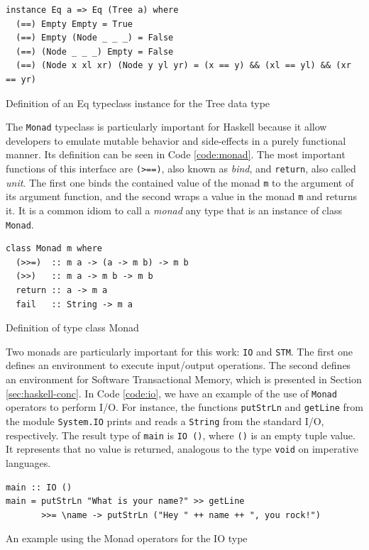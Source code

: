 \begin{listing}
  \begin{verbatim}
instance Eq a => Eq (Tree a) where
  (==) Empty Empty = True
  (==) Empty (Node _ _ _) = False
  (==) (Node _ _ _) Empty = False
  (==) (Node x xl xr) (Node y yl yr) = (x == y) && (xl == yl) && (xr == yr)
  \end{verbatim}
  \caption{Definition of an Eq typeclass instance for the Tree data type}
  \label{code:tree-eq}
\end{listing}

The \texttt{Monad} typeclass is particularly important for Haskell because it allow developers to emulate mutable behavior and side-effects in a purely functional manner. Its definition can be seen in Code \ref{code:monad}. The most important functions of this interface are \texttt{(>==)}, also known as \emph{bind}, and \texttt{return}, also called \emph{unit}. The first one binds the contained value of the monad \texttt{m} to the argument of its argument function, and the second wraps a value in the monad \texttt{m} and returns it. It is a common idiom to call a \emph{monad} any type that is an instance of class \texttt{Monad}.

\begin{listing}
  \begin{verbatim}
class Monad m where
  (>>=)  :: m a -> (a -> m b) -> m b
  (>>)   :: m a -> m b -> m b
  return :: a -> m a
  fail   :: String -> m a
  \end{verbatim}
  \caption{Definition of type class Monad}
  \label{code:monad}
\end{listing}

Two monads are particularly important for this work: \texttt{IO} and \texttt{STM}. The first one defines an environment to execute input/output operations. The second defines an environment for Software Transactional Memory, which is presented in Section \ref{sec:haskell-conc}. In Code \ref{code:io}, we have an example of the use of \texttt{Monad} operators to perform I/O. For instance, the functions \texttt{putStrLn} and \texttt{getLine} from the module \texttt{System.IO} prints and reads a \texttt{String} from the standard I/O, respectively. The result type of \texttt{main} is \texttt{IO ()}, where \texttt{()} is an empty tuple value. It represents that no value is returned, analogous to the type \texttt{void} on imperative languages.

\begin{listing}
  \begin{verbatim}
main :: IO ()
main = putStrLn "What is your name?" >> getLine
       >>= \name -> putStrLn ("Hey " ++ name ++ ", you rock!")
  \end{verbatim}
  \caption{An example using the Monad operators for the IO type}
  \label{code:io}
\end{listing}

